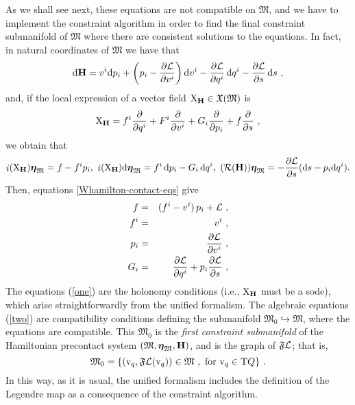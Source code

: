 \documentclass[12pt]{report}
\def\bea{\begin{eqnarray}}
\def\eea{\end{eqnarray}}
\def\derpar#1#2{\frac{\partial{#1}}{\partial{#2}}}
\def\vf{\mathfrak X}
\def\Lag{{\cal L}}
\def\d{{\rm d}}
\def\bmeta{\mbox{\boldmath $\eta$}}
\def\X{{\rm X}}
\def\Tan{{\rm T}}
\def\inn{\mathop{i}\nolimits}
\newcommand{\Reeb}{\mathcal{R}}
\begin{document}
As we shall see next,
these equations are not compatible on $\mathfrak{M}$,
and we have to implement the constraint algorithm
in order to find the final constraint submanifold of $\mathfrak{M}$
where there are consistent solutions
to the equations. 
In fact, in natural coordinates of $\mathfrak{M}$ we have that
$$
\d{\bf H}=v^i\d p_i+\left(p_i -\derpar{\Lag}{v^i}\right)\d v^i-\derpar{\Lag}{q^i}\,\d q^i-\derpar{\Lag}{s}\,\d s \ ,
$$
and, if the local expression of
a vector field $\X_{\bf H}\in\vf(\mathfrak{M})$ is
$$
\X_{\bf H} = f^i\derpar{}{q^i}+F^i\derpar{}{v^i}+G_i\derpar{}{p_i}+f\derpar{}{s} \ ,
$$
we obtain that
$$
\inn(\X_{\bf H})\bmeta_{\mathfrak{M}}=f-f^ip_i  , \,\,
\inn(\X_{\bf H})\d\bmeta_{\mathfrak{M}}=f^i\,\d p_i-G_i\,\d q^i 
 , \,\,
({\Reeb}({\bf H}))\bmeta_{\mathfrak{M}}=-\derpar{\Lag}{s}(\d s-p_i\d q^i).
$$
Then, equations \eqref{Whamilton-contact-eqs} give
\bea
f&=&(f^i-v^i)\,p_i+\Lag \ ,
\label{zero} \\
f^i&=&v^i \ , \label{one} \\
p_i&=&\derpar{\Lag}{v^i} \ ,
\label{two} \\
G_i&=&\derpar{\Lag}{q^i}
+p_i\derpar{\Lag}{s} \ ,
\label{three}
\eea
The equations (\ref{one}) are the holonomy conditions
(i.e., $\X_{\bf H}$ must be a {\sc sode}),
which arise straightforwardly from the unified formalism.
The algebraic equations (\ref{two}) are compatibility conditions
defining the submanifold $\mathfrak{M}_0\hookrightarrow\mathfrak{M}$,
where the equations are compatible.
This $\mathfrak{M}_0$ is the {\sl first constraint submanifold} of the Hamiltonian precontact system $(\mathfrak{M},\bmeta_{\mathfrak{M}},{\bf H})$, and is the graph of $\mathfrak{F}\Lag$; that is,
$$
\mathfrak{M}_0=\{ ({\rm v}_q,\mathfrak{F}\Lag({\rm v}_q))\in\mathfrak{M} \ ,\ \mbox{\rm for ${\rm v}_q\in\Tan Q$}\} \ .
$$
In this way, as it is usual, the unified formalism includes the definition of
the Legendre map as a consequence of the constraint algorithm.
\end{document}
